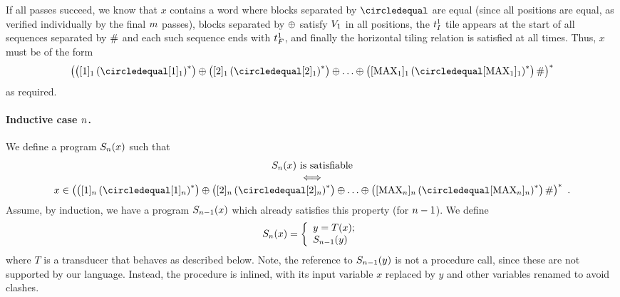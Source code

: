 If all passes succeed, we know that $x$ contains a word where blocks separated by $\numeq$ are equal
(since all positions are equal, as verified individually by the final $m$ passes),
blocks separated by $\oplus$ satisfy $V_{1}$ in all positions,
the $t_I^{1}$ tile appears at the start of all sequences separated by $\#$ and each such sequence ends with $t_F^{1}$, and
finally the horizontal tiling relation is satisfied at all times.
Thus, $x$ must be of the form
\[
    \brac{
        \brac{\tenc{1}{1} \brac{\numeq \tenc{1}{1}}^\ast}
        \numplus
        \brac{\tenc{1}{2} \brac{\numeq \tenc{1}{2}}^\ast}
        \numplus
        \ldots
        \numplus
        \brac{
            \tenc{1}{\nmax{1}}
                \brac{\numeq \tenc{1}{\nmax{1}}}^\ast
        }
        \numsep
    }^\ast
\]
as required.


\paragraph{Inductive case $n$.}

We define a program
${S_{n}}\mathord{\left( x \right)}$
such that
\[
    \begin{array}{c}
        \goodnums{\expheight}{x} \text{ is satisfiable} \\
        \iff \\
        x \in \brac{
            \brac{\tenc{\expheight}{1} \brac{\numeq \tenc{\expheight}{1}}^\ast}
            \numplus
            \brac{\tenc{\expheight}{2} \brac{\numeq \tenc{\expheight}{2}}^\ast}
            \numplus
            \ldots
            \numplus
            \brac{
                \tenc{\expheight}{\nmax{\expheight}}
                    \brac{\numeq \tenc{\expheight}{\nmax{\expheight}}}^\ast
            }
            \numsep
        }^\ast \ .
    \end{array}
\]
Assume, by induction, we have a program
${S_{n-1}}\mathord{\left( x \right)}$
which already satisfies this property (for $n-1$).
We define
\[
    {S_{n}}\mathord{\left( x \right)} =
    \left\{
        \begin{array}{l}
            y = {T}\mathord{\left( x \right)}; \\
            {S_{n-1}}\mathord{\left( y \right)}
        \end{array}
    \right.
\]
where $T$ is a transducer that behaves as described below.
Note, the reference to
${S_{n-1}}\mathord{\left( y \right)}$
is not a procedure call, since these are not supported by our language.
Instead, the procedure is inlined, with its input variable $x$ replaced by $y$ and other variables renamed to avoid clashes.

